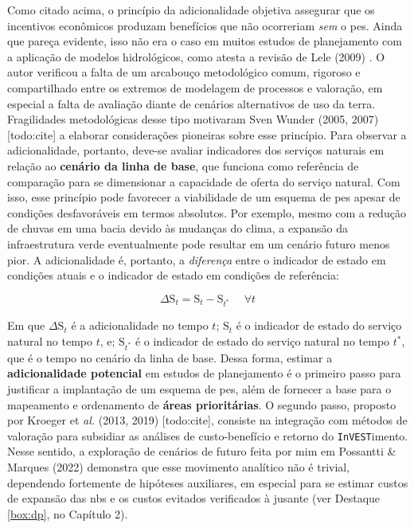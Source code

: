 \documentclass[./main.tex]{subfiles}
\begin{document}
Como citado acima, o princípio da adicionalidade objetiva assegurar que os incentivos econômicos produzam benefícios que não ocorreriam \textit{sem} o \acrshort{pes}. Ainda que pareça evidente, isso não era o caso em muitos estudos de planejamento com a aplicação de modelos hidrológicos, como atesta a revisão de Lele (2009) \cite{Lele2009a}. O autor verificou a falta de um arcabouço metodológico comum, rigoroso e compartilhado entre os extremos de modelagem de processos e valoração, em especial a falta de avaliação diante de cenários alternativos de uso da terra. Fragilidades metodológicas desse tipo motivaram Sven Wunder (2005, 2007) [todo:cite] a elaborar considerações pioneiras sobre esse princípio. Para observar a adicionalidade, portanto, deve-se avaliar indicadores dos serviços naturais em relação ao \textbf{cenário da linha de base}, que funciona como referência de comparação para se dimensionar a capacidade de oferta do serviço natural. Com isso, esse princípio pode favorecer a viabilidade de um esquema de \acrshort{pes} apesar de condições desfavoráveis em termos absolutos. Por exemplo, mesmo com a redução de chuvas em uma bacia devido às mudanças do clima, a expansão da infraestrutura verde eventualmente pode resultar em um cenário futuro menos pior. A adicionalidade é, portanto, a \textit{diferença} entre o indicador de estado em condições atuais e o indicador de estado em condições de referência:
\begin{linenomath*}
\begin{equation}
\label{eq:aditionality}
\Delta\text{S}_{t} = \text{S}_{t} - \text{S}_{t^*} \quad \; \forall t 
\end{equation}
\end{linenomath*}
\noindent Em que $\Delta\text{S}_{t}$ é a adicionalidade no tempo $t$; $\text{S}_{t}$ é o indicador de estado do serviço natural no tempo $t$, e; $\text{S}_{t^*}$ é o indicador de estado do serviço natural no tempo $t^*$, que é o tempo no cenário da linha de base. Dessa forma, estimar a \textbf{adicionalidade potencial} em estudos de planejamento é o primeiro passo para justificar a implantação de um esquema de \acrshort{pes}, além de fornecer a base para o mapeamento e ordenamento de \textbf{áreas prioritárias}. O segundo passo, proposto por Kroeger et \textit{al.} (2013, 2019) [todo:cite], consiste na integração com métodos de valoração para subsidiar as análises de custo-benefício e retorno do \texttt{InVEST}imento. Nesse sentido, a exploração de cenários de futuro feita por mim em Possantti \& Marques (2022) \cite{Possantti2022a} demonstra que esse movimento analítico não é trivial, dependendo fortemente de hipóteses auxiliares, em especial para se estimar custos de expansão das \acrshort{nbs} e os custos evitados verificados à jusante (ver Destaque \ref{box:dp}, no Capítulo 2).
\end{document}
